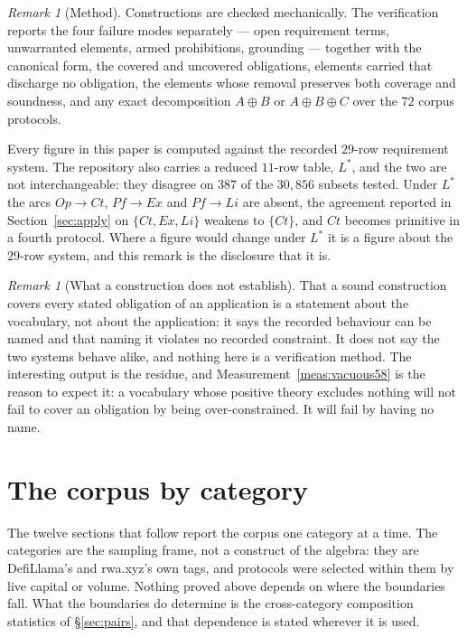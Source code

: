 \documentclass[11pt,reqno]{amsart}
\theoremstyle{plain}
\theoremstyle{definition}
\theoremstyle{remark}
\newtheorem{remark}[theorem]{Remark}
\begin{document}
\begin{remark}[Method]\label{rem:checker}
Constructions are checked mechanically. The verification reports the four failure
modes separately --- open requirement terms, unwarranted elements, armed
prohibitions, grounding --- together with the canonical form, the covered and
uncovered obligations, elements carried that discharge no obligation, the
elements whose removal preserves both coverage and soundness, and any exact
decomposition $A \oplus B$ or $A \oplus B \oplus C$ over the $72$ corpus
protocols.  

Every figure in this paper is computed against the recorded $29$-row requirement
system. The repository also carries a reduced $11$-row table, $L^{*}$, and the
two are not interchangeable: they disagree on $387$ of the $30{,}856$ subsets
tested. Under $L^{*}$ the arcs $Op \to Ct$, $Pf \to Ex$ and $Pf \to Li$ are
absent, the agreement reported in Section~\ref{sec:apply} on $\{Ct, Ex, Li\}$
weakens to $\{Ct\}$, and $Ct$ becomes primitive in a fourth protocol. Where a
figure would change under $L^{*}$ it is a figure about the $29$-row system, and
this remark is the disclosure that it is.
\end{remark}

\begin{remark}[What a construction does not establish]
That a sound construction covers every stated obligation of an application is a
statement about the vocabulary, not about the application: it says the recorded
behaviour can be named and that naming it violates no recorded constraint. It
does not say the two systems behave alike, and nothing here is a verification
method. The interesting output is the residue, and
Measurement~\ref{meas:vacuous58} is the reason to expect it: a vocabulary whose
positive theory excludes nothing will not fail to cover an obligation by being
over-constrained. It will fail by having no name.
\end{remark}

\section*{The corpus by category}\label{sec:atlas}

The twelve sections that follow report the corpus one category at a time. The
categories are the sampling frame, not a construct of the algebra: they are
DefiLlama's and rwa.xyz's own tags, and protocols were selected within them by
live capital or volume. Nothing proved above depends on where the boundaries
fall. What the boundaries do determine is the cross-category composition
statistics of \S\ref{sec:pairs}, and that dependence is stated wherever it is
used.
\end{document}
